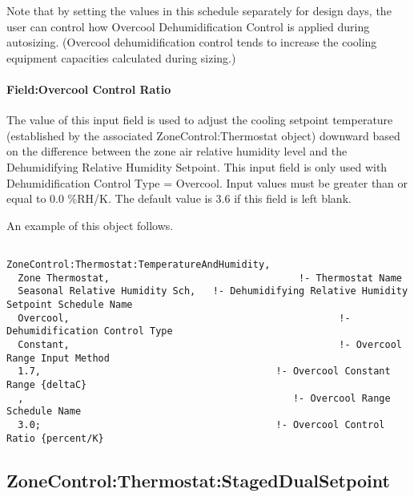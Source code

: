 Note that by setting the values in this schedule separately for design days, the user can control how Overcool Dehumidification Control is applied during autosizing. (Overcool dehumidification control tends to increase the cooling equipment capacities calculated during sizing.)

\paragraph{Field:Overcool Control Ratio}\label{fieldovercool-control-ratio}

The value of this input field is used to adjust the cooling setpoint temperature (established by the associated ZoneControl:Thermostat object) downward based on the difference between the zone air relative humidity level and the Dehumidifying Relative Humidity Setpoint. This input field is only used with Dehumidification Control Type = Overcool. Input values must be greater than or equal to 0.0 \%RH/K. The default value is 3.6 if this field is left blank.

An example of this object follows.

\begin{lstlisting}

ZoneControl:Thermostat:TemperatureAndHumidity,
  Zone Thermostat,                                 !- Thermostat Name
  Seasonal Relative Humidity Sch,   !- Dehumidifying Relative Humidity Setpoint Schedule Name
  Overcool,                                               !- Dehumidification Control Type
  Constant,                                               !- Overcool Range Input Method
  1.7,                                         !- Overcool Constant Range {deltaC}
  ,                                               !- Overcool Range Schedule Name
  3.0;                                         !- Overcool Control Ratio {percent/K}
\end{lstlisting}

\subsection{ZoneControl:Thermostat:StagedDualSetpoint}\label{zonecontrolthermostatstageddualsetpoint}

